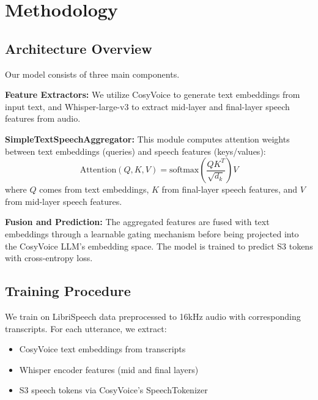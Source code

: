 \documentclass[10pt,twocolumn,letterpaper]{article}
\begin{document}
\section{Methodology}

\subsection{Architecture Overview}

Our model consists of three main components.

\begin{figure}[t]
\centering
\end{figure}

\textbf{Feature Extractors:} We utilize CosyVoice to generate text embeddings from input text, and Whisper-large-v3 to extract mid-layer and final-layer speech features from audio.

\textbf{SimpleTextSpeechAggregator:} This module computes attention weights between text embeddings (queries) and speech features (keys/values):
\begin{equation}
\text{Attention}(Q,K,V) = \text{softmax}\left(\frac{QK^T}{\sqrt{d_k}}\right)V
\end{equation}
where $Q$ comes from text embeddings, $K$ from final-layer speech features, and $V$ from mid-layer speech features.

\textbf{Fusion and Prediction:} The aggregated features are fused with text embeddings through a learnable gating mechanism before being projected into the CosyVoice LLM's embedding space. The model is trained to predict S3 tokens with cross-entropy loss.

\subsection{Training Procedure}

We train on LibriSpeech data preprocessed to 16kHz audio with corresponding transcripts. For each utterance, we extract:
\begin{itemize}
\item CosyVoice text embeddings from transcripts
\item Whisper encoder features (mid and final layers)
\item S3 speech tokens via CosyVoice's SpeechTokenizer
\end{itemize}
\end{document}
